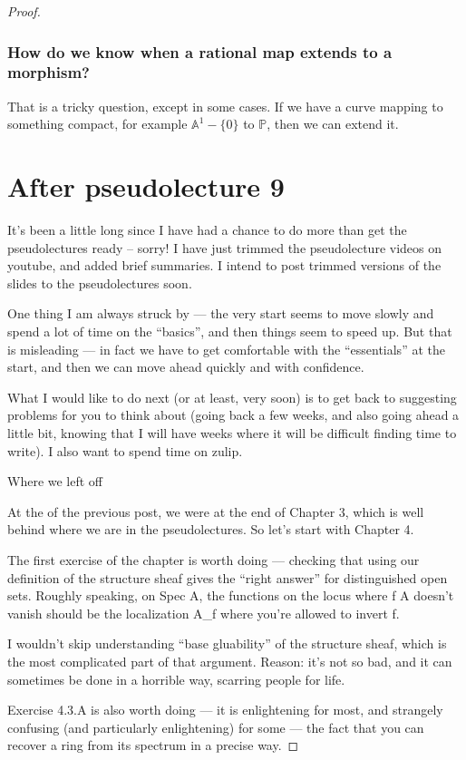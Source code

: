 \documentclass{book}
\renewcommand{\P}{\ensuremath{\mathbb{P}}}
\newcommand{\A}{\ensuremath{\mathbb{A}}}
\theoremstyle{definition}
\begin{document}
\begin{proof}
\subsection{How do we know when a rational map extends to a morphism?}

That is a tricky question, except in some cases.
If we have a curve mapping to something compact, for example $\A^1 - \{ 0 \}$ to $\P$,
then we can extend it.

\chapter{After pseudolecture 9}

It’s been a little long since I have had a chance to do more than get the pseudolectures ready – sorry! I have just trimmed the pseudolecture videos on youtube, and added brief summaries. I intend to post trimmed versions of the slides to the pseudolectures soon.

One thing I am always struck by — the very start seems to move slowly and spend a lot of time on the “basics”, and then things seem to speed up. But that is misleading — in fact we have to get comfortable with the “essentials” at the start, and then we can move ahead quickly and with confidence.

What I would like to do next (or at least, very soon) is to get back to suggesting problems for you to think about (going back a few weeks, and also going ahead a little bit, knowing that I will have weeks where it will be difficult finding time to write). I also want to spend time on zulip.

Where we left off

At the of the previous post, we were at the end of Chapter 3, which is well behind where we are in the pseudolectures. So let’s start with Chapter 4.

The first exercise of the chapter is worth doing — checking that using our definition of the structure sheaf gives the “right answer” for distinguished open sets. Roughly speaking, on \rm{Spec} \; A, the functions on the locus where f \in A doesn’t vanish should be the localization A_f where you’re allowed to invert f.

I wouldn’t skip understanding “base gluability” of the structure sheaf, which is the most complicated part of that argument. Reason: it’s not so bad, and it can sometimes be done in a horrible way, scarring people for life.

Exercise 4.3.A is also worth doing — it is enlightening for most, and strangely confusing (and particularly enlightening) for some — the fact that you can recover a ring from its spectrum in a precise way.


\end{proof}
\end{document}
